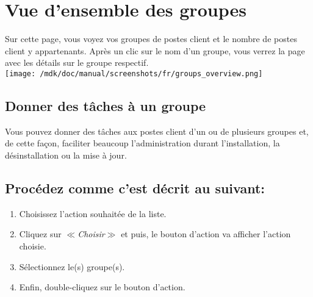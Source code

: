 \section{Vue d'ensemble des groupes}Sur cette page, vous voyez vos groupes de postes client et le nombre de postes client y appartenants. Apr\`es un clic sur le nom d'un groupe, vous verrez la page avec les d\'etails sur le groupe respectif.\\
\texttt{[image: /mdk/doc/manual/screenshots/fr/groups\_overview.png]} \\
\subsection{Donner des t\^aches \`a un groupe}
Vous pouvez donner des t\^aches aux postes client d'un ou de plusieurs groupes et, de cette fa\c{c}on, faciliter beaucoup l'administration durant l'installation, la d\'esinstallation ou la mise \`a jour.\\
\subsection{Proc\'edez comme c'est d\'ecrit au suivant:}
\begin{enumerate}
\item Choisissez l'action souhait\'ee de la liste.\\
\item Cliquez sur \textit{$\ll$Choisir$\gg$} et puis, le bouton d'action va afficher l'action choisie.\\
\item S\'electionnez le(s) groupe(s).\\
\item Enfin, double-cliquez sur le bouton d'action.\\
\end{enumerate}
